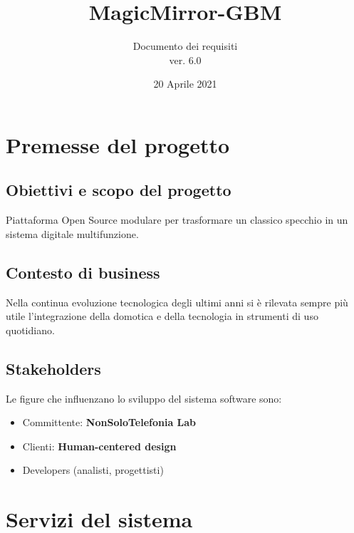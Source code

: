 \documentclass[a4paper,11pt,titlepage]{article}       %
\begin{document}
\author{Documento dei requisiti \\ ver. 6.0}                             %
\title{MagicMirror-GBM}                    %
\date{20 Aprile 2021}                                %
\maketitle

\tableofcontents
\newpage


\section{Premesse del progetto}
    \subsection{Obiettivi e scopo del progetto}
        Piattaforma Open Source modulare per trasformare un classico specchio in un sistema digitale multifunzione.
    \subsection{Contesto di business}
        Nella continua evoluzione tecnologica degli ultimi anni si è rilevata sempre più utile l'integrazione della domotica e della tecnologia in strumenti di uso quotidiano.
    \subsection{Stakeholders}
        Le figure che influenzano lo sviluppo del sistema software sono:
        \begin{itemize}
            \item Committente: \textbf{NonSoloTelefonia Lab}
            \item Clienti: \textbf{\gls{Human-centered design}}
            \item Developers (analisti, progettisti)
        \end{itemize}

\newpage

\section{Servizi del sistema}
    
\end{document}
